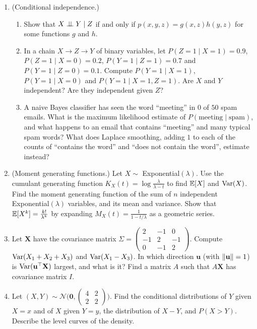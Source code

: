 \begin{enumerate}[leftmargin=*]
\begin{enumerate}[label=(\alph*)]
    \end{enumerate}
    \item (Conditional independence.)
    \begin{enumerate}[label=(\alph*)]
        \item Show that $X \perp\!\!\!\perp Y \mid Z$ if and only if $p(x, y, z) = g(x, z)h(y, z)$ for some functions $g$ and $h$.
        \item In a chain $X \to Z \to Y$ of binary variables, let $P(Z = 1 \mid X = 1) = 0.9$, $P(Z = 1 \mid X = 0) = 0.2$, $P(Y = 1 \mid Z = 1) = 0.7$ and $P(Y = 1 \mid Z = 0) = 0.1$. Compute $P(Y = 1 \mid X = 1)$, $P(Y = 1 \mid X = 0)$ and $P(Y = 1 \mid X = 1, Z = 1)$. Are $X$ and $Y$ independent? Are they independent given $Z$?
        \item A naive Bayes classifier has seen the word ``meeting'' in $0$ of $50$ spam emails. What is the maximum likelihood estimate of $P(\text{meeting} \mid \text{spam})$, and what happens to an email that contains ``meeting'' and many typical spam words? What does Laplace smoothing, adding $1$ to each of the counts of ``contains the word'' and ``does not contain the word'', estimate instead?
    \end{enumerate}
    \item \homework{} (Moment generating functions.) Let $X \sim$ Exponential$(\lambda)$. Use the cumulant generating function $K_X(t) = \log\frac{\lambda}{\lambda - t}$ to find $\mathbb{E}[X]$ and $\operatorname{Var}(X)$. Find the moment generating function of the sum of $n$ independent Exponential$(\lambda)$ variables, and its mean and variance. Show that $\mathbb{E}[X^k] = \frac{k!}{\lambda^k}$ by expanding $M_X(t) = \frac{1}{1 - t/\lambda}$ as a geometric series.
    \item Let $\mathbf{X}$ have the covariance matrix $\Sigma = \begin{pmatrix} 2 & -1 & 0 \\ -1 & 2 & -1 \\ 0 & -1 & 2 \end{pmatrix}$. Compute $\operatorname{Var}(X_1 + X_2 + X_3)$ and $\operatorname{Var}(X_1 - X_3)$. In which direction $\mathbf{u}$ (with $\lVert \mathbf{u} \rVert = 1$) is $\operatorname{Var}(\mathbf{u}^\top\mathbf{X})$ largest, and what is it? Find a matrix $A$ such that $A\mathbf{X}$ has covariance matrix $I$.
    \item \homework{} Let $(X, Y) \sim \mathcal{N}\Big(\mathbf{0}, \begin{pmatrix} 4 & 2 \\ 2 & 2 \end{pmatrix}\Big)$. Find the conditional distributions of $Y$ given $X = x$ and of $X$ given $Y = y$, the distribution of $X - Y$, and $P(X > Y)$. Describe the level curves of the density.

\end{enumerate}
